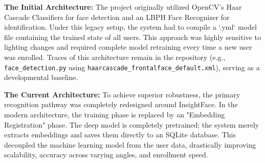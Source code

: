 \documentclass[12pt,a4paper]{report}
\begin{document}
\textbf{The Initial Architecture:} The project originally utilized OpenCV's Haar Cascade Classifiers for face detection and an LBPH Face Recognizer for identification. Under this legacy setup, the system had to compile a `.yml` model file containing the trained state of all users. This approach was highly sensitive to lighting changes and required complete model retraining every time a new user was enrolled. Traces of this architecture remain in the repository (e.g., \texttt{face\_detection.py} using \texttt{haarcascade\_frontalface\_default.xml}), serving as a developmental baseline.

\textbf{The Current Architecture:} To achieve superior robustness, the primary recognition pathway was completely redesigned around InsightFace. In the modern architecture, the training phase is replaced by an "Embedding Registration" phase. The deep model is completely pretrained; the system merely extracts embeddings and saves them directly to an SQLite database. This decoupled the machine learning model from the user data, drastically improving scalability, accuracy across varying angles, and enrollment speed.
\end{document}
